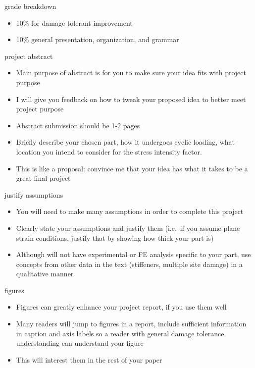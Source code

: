 \documentclass[
  letterpaper,
  ignorenonframetext,
  aspectratio=43,
  handout,
  12pt]{beamer}
\providecommand{\tightlist}{%
  \setlength{\itemsep}{0pt}\setlength{\parskip}{0pt}}
\providecommand{\tightlist}{%
\setlength{\itemsep}{0pt}\setlength{\parskip}{0pt}}
\begin{document}
\begin{frame}{grade breakdown}
\protect\hypertarget{grade-breakdown-1}{}
\begin{itemize}
\tightlist
\item
  10\% for damage tolerant improvement
\item
  10\% general presentation, organization, and grammar
\end{itemize}
\end{frame}

\begin{frame}{project abstract}
\protect\hypertarget{project-abstract}{}
\begin{itemize}
\tightlist
\item
  Main purpose of abstract is for you to make sure your idea fits with
  project purpose
\item
  I will give you feedback on how to tweak your proposed idea to better
  meet project purpose
\item
  Abstract submission should be 1-2 pages
\item
  Briefly describe your chosen part, how it undergoes cyclic loading,
  what location you intend to consider for the stress intensity factor.
\item
  This is like a proposal: convince me that your idea has what it takes
  to be a great final project
\end{itemize}
\end{frame}

\begin{frame}{justify assumptions}
\protect\hypertarget{justify-assumptions}{}
\begin{itemize}
\tightlist
\item
  You will need to make many assumptions in order to complete this
  project
\item
  Clearly state your assumptions and justify them (i.e.~if you assume
  plane strain conditions, justify that by showing how thick your part
  is)
\item
  Although will not have experimental or FE analysis specific to your
  part, use concepts from other data in the text (stiffeners, multiple
  site damage) in a qualitative manner
\end{itemize}
\end{frame}

\begin{frame}{figures}
\protect\hypertarget{figures}{}
\begin{itemize}
\tightlist
\item
  Figures can greatly enhance your project report, if you use them well
\item
  Many readers will jump to figures in a report, include sufficient
  information in caption and axis labels so a reader with general damage
  tolerance understanding can understand your figure
\item
  This will interest them in the rest of your paper
\end{itemize}
\end{frame}
\end{document}
